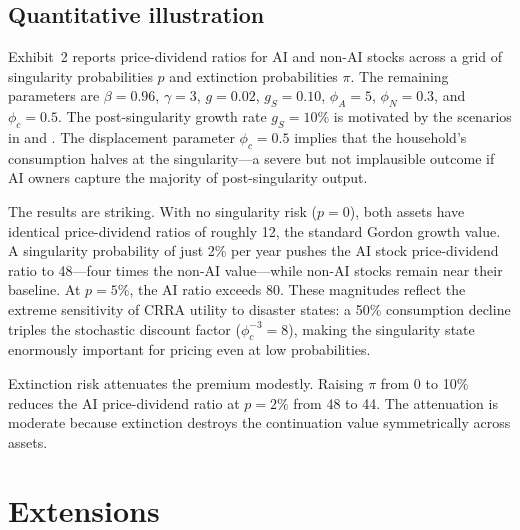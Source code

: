 \documentclass[12pt]{article}
\begin{document}
\subsection{Quantitative illustration}

Exhibit~2 reports price-dividend ratios for AI and non-AI stocks across a grid of singularity probabilities $p$ and extinction probabilities $\pi$.
The remaining parameters are $\beta = 0.96$, $\gamma = 3$, $g = 0.02$, $g_S = 0.10$, $\phi_A = 5$, $\phi_N = 0.3$, and $\phi_c = 0.5$.
The post-singularity growth rate $g_S = 10\%$ is motivated by the scenarios in \citet{Jones2024} and \citet{KorinekSuh2024}.
The displacement parameter $\phi_c = 0.5$ implies that the household's consumption halves at the singularity---a severe but not implausible outcome if AI owners capture the majority of post-singularity output.

\begin{table}[t]
\centering
\caption{Price-dividend ratios under varying singularity and extinction probabilities.  $p$ is the per-period singularity probability; $\pi$ is the extinction probability conditional on singularity.  Baseline parameters: $\beta = 0.96$, $\gamma = 3$, $g = 0.02$, $g_S = 0.10$, $\phi_A = 5$, $\phi_N = 0.3$, $\phi_c = 0.5$.}
\label{tab:pd} %

\end{table}

The results are striking.
With no singularity risk ($p = 0$), both assets have identical price-dividend ratios of roughly 12, the standard Gordon growth value.
A singularity probability of just 2\% per year pushes the AI stock price-dividend ratio to 48---four times the non-AI value---while non-AI stocks remain near their baseline.
At $p = 5\%$, the AI ratio exceeds 80.
These magnitudes reflect the extreme sensitivity of CRRA utility to disaster states: a 50\% consumption decline triples the stochastic discount factor ($\phi_c^{-3} = 8$), making the singularity state enormously important for pricing even at low probabilities.

Extinction risk attenuates the premium modestly.
Raising $\pi$ from 0 to 10\% reduces the AI price-dividend ratio at $p = 2\%$ from 48 to 44.
The attenuation is moderate because extinction destroys the continuation value symmetrically across assets.

\section{Extensions}
\end{document}
